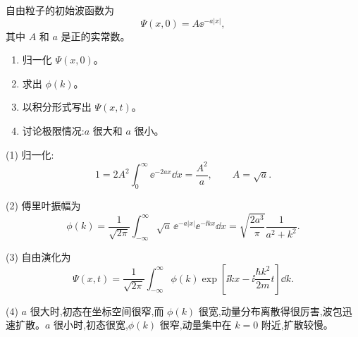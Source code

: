 \begin{question}
自由粒子的初始波函数为
\[
\Psi(x,0)=A\ee^{-a|x|},
\]
其中 $A$ 和 $a$ 是正的实常数。
\begin{enumerate}
\item 归一化 $\Psi(x,0)$。
\item 求出 $\phi(k)$。
\item 以积分形式写出 $\Psi(x,t)$。
\item 讨论极限情况:$a$ 很大和 $a$ 很小。
\end{enumerate}
\begin{solution}
(1) 归一化:
\[
1=2A^2\int_0^\infty \ee^{-2ax}\dd x=\frac{A^2}{a},
\qquad A=\sqrt a.
\]

(2) 傅里叶振幅为
\[
\phi(k)=\frac1{\sqrt{2\pi}}\int_{-\infty}^{\infty}\sqrt a\,\ee^{-a|x|}\ee^{-\ii kx}\dd x
=\sqrt{\frac{2a^3}{\pi}}\frac1{a^2+k^2}.
\]

(3) 自由演化为
\[
\Psi(x,t)=\frac1{\sqrt{2\pi}}\int_{-\infty}^{\infty}\phi(k)
\exp\left[\ii kx-\ii\frac{\hbar k^2}{2m}t\right]\dd k.
\]

(4) $a$ 很大时,初态在坐标空间很窄,而 $\phi(k)$ 很宽,动量分布离散得很厉害,波包迅速扩散。$a$ 很小时,初态很宽,$\phi(k)$ 很窄,动量集中在 $k=0$ 附近,扩散较慢。
\end{solution}
\end{question}

